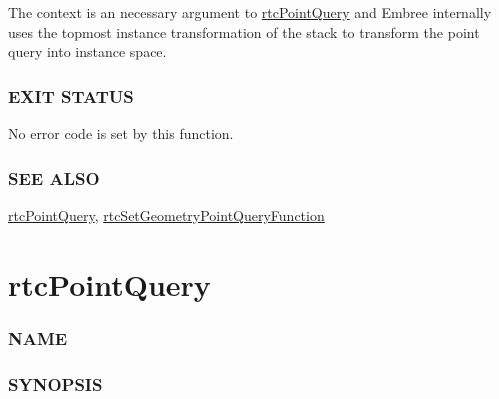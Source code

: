 The context is an necessary argument to
\hyperref[rtcpointquery]{rtcPointQuery} and Embree internally uses the
topmost instance transformation of the stack to transform the point
query into instance space.

\subsubsection{EXIT STATUS}\label{exit-status}

No error code is set by this function.

\subsubsection{SEE ALSO}\label{see-also}

\hyperref[rtcpointquery]{rtcPointQuery},
\hyperref[rtcsetgeometrypointqueryfunction]{rtcSetGeometryPointQueryFunction}

\pagebreak

\section{rtcPointQuery}\label{rtcpointquery}

\subsubsection{NAME}\label{name}

\begin{Shaded}
\begin{Highlighting}[]
\OperatorTok{{-}}
\end{Highlighting}
\end{Shaded}

\subsubsection{SYNOPSIS}\label{synopsis}

